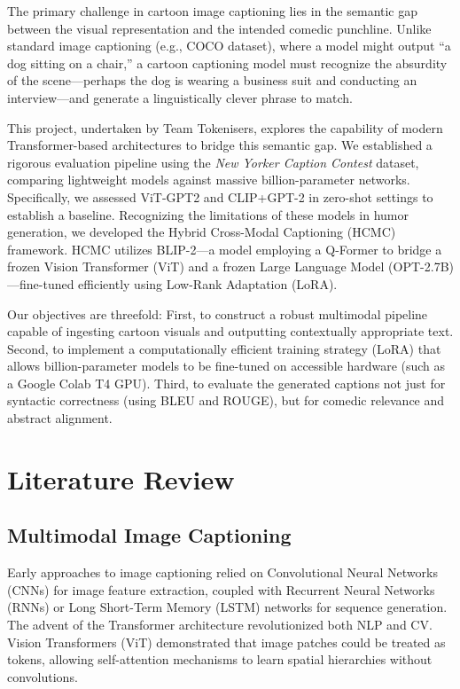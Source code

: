 \documentclass[10pt, conference, compsoc]{IEEEtran}
\begin{document}
The primary challenge in cartoon image captioning lies in the semantic gap between the visual representation and the intended comedic punchline. Unlike standard image captioning (e.g., COCO dataset), where a model might output ``a dog sitting on a chair,'' a cartoon captioning model must recognize the absurdity of the scene—perhaps the dog is wearing a business suit and conducting an interview—and generate a linguistically clever phrase to match.

This project, undertaken by Team Tokenisers, explores the capability of modern Transformer-based architectures to bridge this semantic gap. We established a rigorous evaluation pipeline using the \textit{New Yorker Caption Contest} dataset, comparing lightweight models against massive billion-parameter networks. Specifically, we assessed ViT-GPT2 and CLIP+GPT-2 in zero-shot settings to establish a baseline. Recognizing the limitations of these models in humor generation, we developed the Hybrid Cross-Modal Captioning (HCMC) framework. HCMC utilizes BLIP-2—a model employing a Q-Former to bridge a frozen Vision Transformer (ViT) and a frozen Large Language Model (OPT-2.7B)—fine-tuned efficiently using Low-Rank Adaptation (LoRA).

Our objectives are threefold: First, to construct a robust multimodal pipeline capable of ingesting cartoon visuals and outputting contextually appropriate text. Second, to implement a computationally efficient training strategy (LoRA) that allows billion-parameter models to be fine-tuned on accessible hardware (such as a Google Colab T4 GPU). Third, to evaluate the generated captions not just for syntactic correctness (using BLEU and ROUGE), but for comedic relevance and abstract alignment.

\section{Literature Review}

\subsection{Multimodal Image Captioning}
Early approaches to image captioning relied on Convolutional Neural Networks (CNNs) for image feature extraction, coupled with Recurrent Neural Networks (RNNs) or Long Short-Term Memory (LSTM) networks for sequence generation. The advent of the Transformer architecture revolutionized both NLP and CV. Vision Transformers (ViT) demonstrated that image patches could be treated as tokens, allowing self-attention mechanisms to learn spatial hierarchies without convolutions. 
\end{document}
